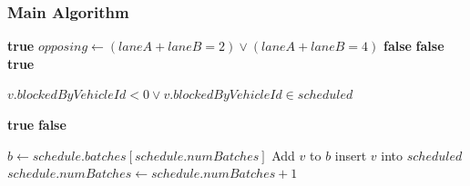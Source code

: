 \documentclass[fleqn,10pt]{olplainarticle}
\begin{document}
\subsubsection{Main Algorithm}

\begin{algorithm}[H]
\caption{\textsc{MovementsConflict}$(laneA, turnA, laneB, turnB)$}
\begin{algorithmic}[1]
    \State \Return \textbf{true}
\EndIf
\State $opposing \gets (laneA + laneB = 2) \lor (laneA + laneB = 4)$
    \State \Return \textbf{false}
\EndIf
{}
    \State \Return \textbf{false}
\EndIf
\State \Return \textbf{true}
\end{algorithmic}
\end{algorithm}

\begin{algorithm}[H]
\caption{\textsc{IsBlockerScheduled}$(v, scheduled)$}
\begin{algorithmic}[1]
\State \Return $v.blockedByVehicleId < 0 \lor v.blockedByVehicleId \in scheduled$
\end{algorithmic}
\end{algorithm}

\begin{algorithm}[H]
\caption{\textsc{ConflictsWithBatch}$(v,\ batch,\ proposals)$}
\begin{algorithmic}[1]
        \State \Return \textbf{true}
    \EndIf
\EndFor
\State \Return \textbf{false}
\end{algorithmic}
\end{algorithm}

\begin{algorithm}[H]
\caption{\textsc{AddVehicleToBatch}$(v,\ schedule,\ proposals,\ scheduled)$}
\begin{algorithmic}[1]
    \State $b \gets schedule.batches[schedule.numBatches]$
        \State Add $v$ to $b$
        \State insert $v$ into $scheduled$
        \State \Return
    \EndIf
        \State $schedule.numBatches \gets schedule.numBatches + 1$
    \EndIf
\EndWhile
\end{algorithmic}
\end{algorithm}
\end{document}
